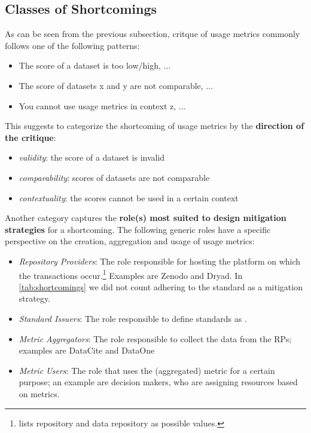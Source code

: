 \documentclass[conference, a4paper]{IEEEtran}\usepackage[]{graphicx}\usepackage[]{color}
\begin{document}
\subsection{Classes of Shortcomings}

As can be seen from the previous subsection,
critque of usage metrics commonly follows one of the following patterns:
\begin{itemize}
    \item The score of a dataset is too low/high, $\dots$
    \item The score of datasets x and y are not comparable, $\dots$
    \item You cannot use usage metrics in context z, $\dots$
\end{itemize}
This suggests to categorize the shortcoming of usage metrics by the \textbf{direction of the critique}:
\begin{itemize}
    \item \emph{validity}: the score of a dataset is invalid
    \item \emph{comparability}: scores of datasets are not comparable
    \item \emph{contextuality}: the scores cannot be used in a certain context
\end{itemize}


Another category captures the \textbf{role(s) most suited to design mitigation strategies}
for a shortcoming.
The following generic roles have a specific perspective
on the creation, aggregation and usage of usage metrics:
\begin{itemize}
    \item \emph{Repository Providers}:
        The role responsible for hosting the platform on which the transactions
        occur.\footnote{\cite{cop} lists repository and data repository as possible values.}
        Examples are Zenodo and Dryad.
        In \autoref{tab:shortcomings} we did not count
        adhering to the standard as a mitigation strategy.
    \item  \emph{Standard Issuers}:
        The role responsible to define standards as \cite{cop}.
    \item  \emph{Metric Aggregators}:
        The role responsible to collect the data from the RPs;
        examples are DataCite and DataOne
    \item  \emph{Metric Users}:
        The role that uses the (aggregated) metric for a certain purpose;
        an example are decision makers, who are assigning resources based on metrics.
\end{itemize}
\end{document}
